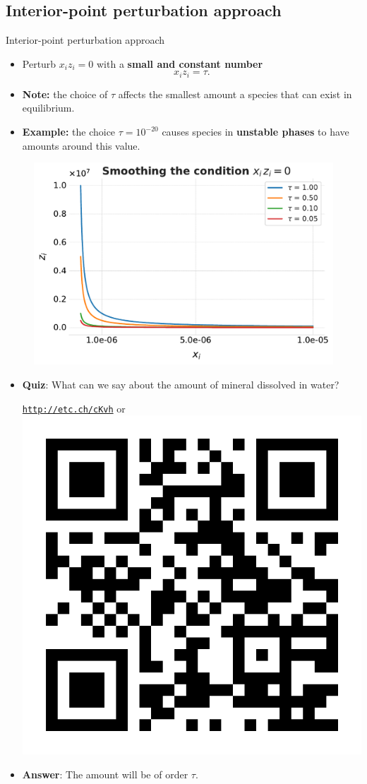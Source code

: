 \subsection{Interior-point perturbation approach}
%
\begin{frame}{Interior-point perturbation approach}
\small 
\lcol
\begin{itemize}
\item Perturb $x_{i}z_{i}=0$ with a \alert{\textbf{small and constant number}}
%
\[
x_{i}z_{i}=\tau.
\]
\item \textbf{Note:} the choice of $\tau$ affects the smallest amount a
species that can exist in equilibrium. 
\item \textbf{Example:} the choice $\tau=10^{-20}$ causes species in
\textbf{unstable phases} to have amounts around this value.  
\end{itemize}
\rcol

\begin{figure}
\centering{}\includegraphics[width=0.8\columnwidth]{figures/numerical-methods-chemical-equilibrium/smoothing-complementarity-condition}
\end{figure}

\ecol

\begin{itemize}
	\item \alert{\bf Quiz}: What can we say about the amount of mineral dissolved in water?
	\begin{center}
		\href{http://etc.ch/cKvh}{\textcolor{indigo(dye)}{\tt http://etc.ch/cKvh}} \quad or \quad 
		\includegraphics[height=0.1\columnwidth]{figures/numerical-methods-chemical-equilibrium/polls.png}
	\end{center}
	\hiddenpause
	\item \alert{\bf Answer}: The amount will be of order $\tau$.
\end{itemize}
\end{frame}
